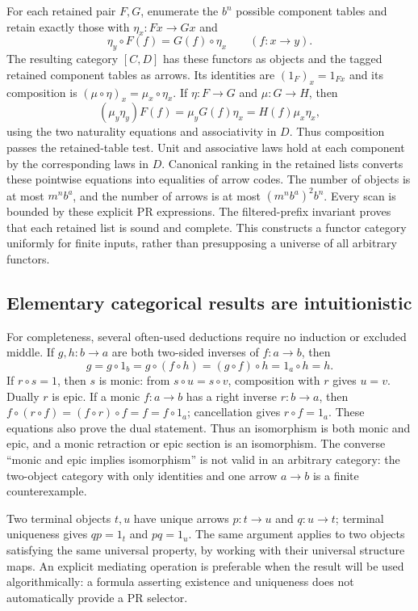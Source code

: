 For each retained pair $F,G$, enumerate the $b^n$ possible component tables
and retain exactly those with
$\eta_x:Fx\to Gx$ and
\[
 \eta_y\circ F(f)=G(f)\circ\eta_x\qquad(f:x\to y).
\]
The resulting category $[C,D]$ has these functors as objects and the tagged
retained component tables as arrows. Its identities are
$(1_F)_x=1_{Fx}$ and its composition is
$(\mu\circ\eta)_x=\mu_x\circ\eta_x$.
If $\eta:F\to G$ and $\mu:G\to H$, then
\[
 (\mu_y\eta_y)F(f)=\mu_yG(f)\eta_x
                 =H(f)\mu_x\eta_x,
\]
using the two naturality equations and associativity in $D$. Thus composition
passes the retained-table test. Unit and associative laws hold at each
component by the corresponding laws in $D$. Canonical ranking in the retained
lists converts these pointwise equations into equalities of arrow codes.
The number of objects is at most $m^n b^a$, and the number of arrows is at
most $(m^n b^a)^2b^n$. Every scan is bounded by these explicit PR expressions.
The filtered-prefix invariant proves that each retained list is sound and
complete. This constructs a functor category uniformly for finite inputs,
rather than presupposing a universe of all arbitrary functors.

\subsection{Elementary categorical results are intuitionistic}

For completeness, several often-used deductions require no induction or
excluded middle.  If $g,h:b\to a$ are both two-sided inverses of $f:a\to b$, then
\[
 g=g\circ 1_b=g\circ(f\circ h)=(g\circ f)\circ h=1_a\circ h=h.
\]
If $r\circ s=1$, then $s$ is monic: from $s\circ u=s\circ v$, composition with
$r$ gives $u=v$.  Dually $r$ is epic.  If a monic $f:a\to b$ has a right inverse
$r:b\to a$, then
$f\circ(r\circ f)=(f\circ r)\circ f=f=f\circ1_a$; cancellation gives
$r\circ f=1_a$.  These equations also prove the dual statement.  Thus an
isomorphism is both monic and epic, and a monic retraction or epic section is an
isomorphism.  The converse ``monic and epic implies isomorphism'' is not valid in
an arbitrary category: the two-object category with only identities and one
arrow $a\to b$ is a finite counterexample.

Two terminal objects $t,u$ have unique arrows $p:t\to u$ and $q:u\to t$; terminal
uniqueness gives $qp=1_t$ and $pq=1_u$.  The same argument applies to two objects
satisfying the same universal property, by working with their universal
structure maps.  An explicit mediating operation is preferable when the result
will be used algorithmically: a formula asserting existence and uniqueness does
not automatically provide a PR selector.

